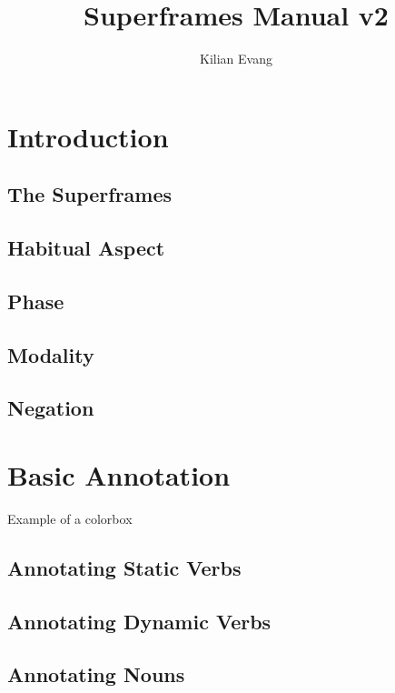 \documentclass[a4paper]{article}
\title{Superframes Manual v2}
\author{Kilian Evang}
\begin{document}
\maketitle

\section{Introduction}

\subsection{The Superframes}

\subsection{Habitual Aspect}

\subsection{Phase}

\subsection{Modality}

\subsection{Negation}

\section{Basic Annotation}

\begin{tcolorbox}
    Example of a colorbox
\end{tcolorbox}

\subsection{Annotating Static Verbs}

\subsection{Annotating Dynamic Verbs}

\subsection{Annotating Nouns}
\end{document}
